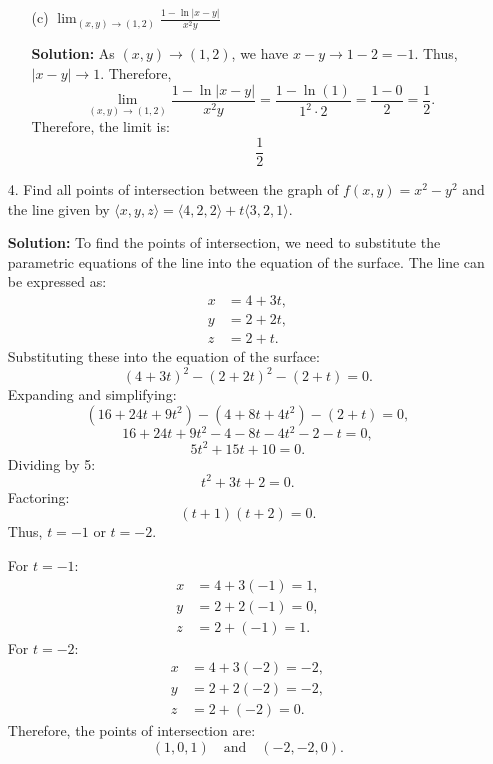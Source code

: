 \documentclass[reqno, 12pt]{amsart}
\begin{document}
\begin{itemize}
\begin{itemize}
      \item[(c)] $\displaystyle\lim_{(x,y)\rightarrow(1,2)}\frac{1-\ln|x-y|}{x^2y}$
        \newline

        \begin{answerbox}
          \textbf{Solution:} As $(x,y) \to (1,2)$, we have $x - y \to 1 - 2 = -1$. Thus, $|x - y| \to 1$. Therefore,
          \[
            \lim_{(x,y) \to (1,2)} \frac{1 - \ln|x - y|}{x^2y} = \frac{1 - \ln(1)}{1^2 \cdot 2} = \frac{1 - 0}{2} = \frac{1}{2}.
          \]
          Therefore, the limit is:
          \[
            \frac{1}{2}
          \]
        \end{answerbox}
        \vspace{0.5 in}

    \end{itemize}

    \newpage
  \item[4.] Find all points of intersection between the graph of $f(x,y) = x^2-y^2$ and the line  given by $\langle x,y,z \rangle = \langle 4,2,2\rangle + t\langle 3,2,1\rangle$.
    \newline

    \begin{answerbox}
      \textbf{Solution:} To find the points of intersection, we need to substitute the parametric equations of the line into the equation of the surface. The line can be expressed as:
      \[
        \begin{aligned}
          x &= 4 + 3t, \\
          y &= 2 + 2t, \\
          z &= 2 + t.
        \end{aligned}
      \]
      Substituting these into the equation of the surface:
      \[
        (4 + 3t)^2 - (2 + 2t)^2 - (2 + t) = 0.
      \]
      Expanding and simplifying:
      \[
        (16 + 24t + 9t^2) - (4 + 8t + 4t^2) - (2 + t) = 0,
      \]
      \[
        16 + 24t + 9t^2 - 4 - 8t - 4t^2 - 2 - t = 0,
      \]
      \[
        5t^2 + 15t + 10 = 0.
      \]
      Dividing by 5:
      \[
        t^2 + 3t + 2 = 0.
      \]
      Factoring:
      \[
        (t + 1)(t + 2) = 0.
      \]
      Thus, \(t = -1\) or \(t = -2\).

      For \(t = -1\):
      \[
        \begin{aligned}
          x &= 4 + 3(-1) = 1, \\
          y &= 2 + 2(-1) = 0, \\
          z &= 2 + (-1) = 1.
        \end{aligned}
      \]
      For \(t = -2\):
      \[
        \begin{aligned}
          x &= 4 + 3(-2) = -2, \\
          y &= 2 + 2(-2) = -2, \\
          z &= 2 + (-2) = 0.
        \end{aligned}
      \]
      Therefore, the points of intersection are:
      \[
        (1, 0, 1) \quad \text{and} \quad (-2, -2, 0).
      \]
    \end{answerbox}
    \vspace{0.5 in}


\end{itemize}
\end{document}
